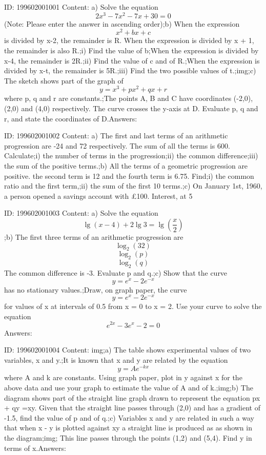 \documentclass{article}
\begin{document}
ID: 199602001001
Content:
a) Solve the equation \[2x^3-7x^2-7x+30=0\](Note: Please enter the answer in ascending order);b) When the expression \[x^2+bx+c\] is divided by x-2, the remainder is R. When the expression is divided by x + 1, the remainder is also R.;i)	Find the value of b;When the expression is divided by x-4, the remainder is 2R.;ii)	Find the value of c and of R.;When the expression is divided by x-t, the remainder is 5R.;iii)	Find the two possible values of t.;img;c) The sketch shows part of the graph of \[y=x^3+px^2+qx+r\] where p, q and r are constants.;The points A, B and C have coordinates (-2,0), (2,0) and (4,0) respectively. The curve crosses the y-axis at D. Evaluate p, q and r, and state the coordinates of D.Answers:

ID: 199602001002
Content:
a) The first and last terms of an arithmetic progression are -24 and 72 respectively. The sum of all the terms is 600. Calculate;i) the number of terms in the progression;ii) the common difference;iii)	the sum of the positive terms.;b) All the terms of a geometric progression are positive. the second term is 12 and the fourth term is 6.75. Find;i) the common ratio and the first term,;ii) the sum of the first 10 terms.;c) On January 1st, 1960, a person opened a savings account with £100. Interest, at 5%

ID: 199602001003
Content:
a) Solve the equation \[\lg (x-4)+2\lg 3 = \lg(\frac{x}{2})\] ;b) The first three terms of an arithmetic progression are \[\log_2(32)\] \[\log_2(p)\] \[\log_2(q)\]  The common difference is -3. Evaluate p and q.;c) Show that the curve \[y=e^x-2e^{-x}\]  has no stationary values.;Draw, on graph paper, the curve \[y=e^x-2e^{-x}\]   for values of x at intervals of 0.5 from x = 0 to x = 2. Use your curve to solve the equation \[e^{2x}-3e^x-2=0\]Answers:

ID: 199602001004
Content:
img;a) The table shows experimental values of two variables, x and y.;It is known that x and y are related by the equation \[y=Ae^{-kx}\] where A and k are constants. Using graph paper, plot in y against x for the above data and use your graph to estimate the value of A and of k.;img;b) The diagram shows part of the straight line graph drawn to represent the equation px + qy =xy. Given that the straight line passes through (2,0) and has a gradient of -1.5, find the value of p and of q.;c) Variables x and y are related in such a way that when x - y is plotted against xy a straight line is produced as as shown in the diagram;img; This line passes through the points (1,2) and (5,4). Find y in terms of x.Answers:
\end{document}
